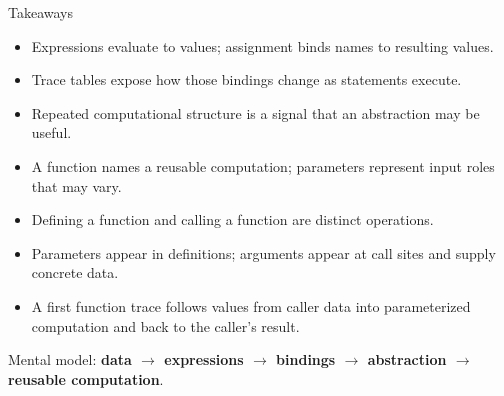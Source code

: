 \documentclass[aspectratio=169,10pt]{beamer}
\begin{document}
\begin{frame}{Takeaways}
  \begin{itemize}
    \item Expressions evaluate to values; assignment binds names to resulting values.
    \item Trace tables expose how those bindings change as statements execute.
    \item Repeated computational structure is a signal that an abstraction may be useful.
    \item A function names a reusable computation; parameters represent input roles that may vary.
    \item Defining a function and calling a function are distinct operations.
    \item Parameters appear in definitions; arguments appear at call sites and supply concrete data.
    \item A first function trace follows values from caller data into parameterized computation and back to the caller's result.
  \end{itemize}

  \begin{keyidea}
    Mental model: \textbf{data $\rightarrow$ expressions $\rightarrow$ bindings $\rightarrow$ abstraction $\rightarrow$ reusable computation}.
  \end{keyidea}
\end{frame}
\end{document}
